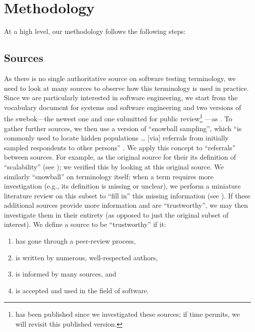 \section{Methodology}
\label{methodology}

At a high level, our
methodology follows the following steps:



\def\addTextEx{For example, \citetISTQB{} \multiAuthHelper{cite}
    \citep{GerrardAndThompson2002} as the original source
    for \ifnotpaper their \else its \fi definition of ``scalability'' (see
    \Cref{scal-test-rec}); we verified\ptq{} this by
    looking at this original source.}

\subsection{Sources}
\label{sources}
As there is no single authoritative source on software testing terminology,
we need to look at many sources to observe how this terminology is used in
practice. Since we are particularly interested in software engineering, we
start from the vocabulary document for systems and software engineering%
\citep{IEEE2017} and two versions of the \acf{swebok}---the newest
one \citep{SWEBOK2014} and one submitted for public review\footnote{
     \citep{SWEBOK2024} has been published since we investigated
    these sources; if time permits, we will revisit this published version.
} \citep{SWEBOK2024}---as \suggSrcs{}. To gather further sources, we then use a version of ``snowball sampling'',
which ``is commonly used to locate hidden populations \dots{} [via] referrals
from initially sampled respondents to other persons'' \citep{Johnson2014}. We
apply this concept to ``referrals'' between sources. \addTextEx{} We similarly
``snowball'' on terminology itself; when a term requires more investigation
(e.g., its definition is missing or unclear), we perform a
miniature literature review on this subset to ``fill in'' this missing
information (see ). If these additional sources provide more
information and are ``trustworthy'', we may then investigate them in their
entirety (as opposed to just the original subset of interest). We define a
source to be ``trustworthy'' if it:
\begin{enumerate}
    \item has gone through a peer-review process,
    \item is written by numerous, well-respected authors,
    \item is informed by many sources, and
    \item is accepted and used in the field of software.
\end{enumerate}

